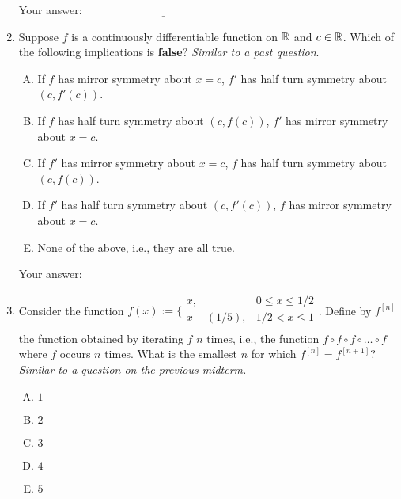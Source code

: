 \documentclass[10pt]{amsart}
\begin{document}
\begin{enumerate}
  
  \vspace{0.05in}
  Your answer: $\underline{\qquad\qquad\qquad\qquad\qquad\qquad\qquad}$
  \vspace{0.05in}
  
\item Suppose $f$ is a continuously differentiable function on $\mathbb{R}$
  and $c \in \mathbb{R}$. Which of the following implications is {\bf false}?
  {\em Similar to a past question}.

  \begin{enumerate}[(A)]
  \item If $f$ has mirror symmetry about $x = c$, $f'$ has half turn
    symmetry about $(c,f'(c))$.
  \item If $f$ has half turn symmetry about $(c,f(c))$, $f'$ has
    mirror symmetry about $x = c$.
  \item If $f'$ has mirror symmetry about $x = c$, $f$ has half turn
    symmetry about $(c,f(c))$.
  \item If $f'$ has half turn symmetry about $(c,f'(c))$, $f$ has
    mirror symmetry about $x = c$.
  \item None of the above, i.e., they are all true.
  \end{enumerate}

  
\vspace{0.05in}
  Your answer: $\underline{\qquad\qquad\qquad\qquad\qquad\qquad\qquad}$
\vspace{0.05in}
  

\item Consider the function $f(x) := \lbrace\begin{array}{rl} x, & 0
  \le x \le 1/2 \\ x - (1/5), & 1/2 < x \le 1 \\\end{array}$. Define by
  $f^{[n]}$ the function obtained by iterating $f$ $n$ times, i.e.,
  the function $f \circ f \circ f \circ \dots \circ f$ where $f$
  occurs $n$ times. What is the smallest $n$ for which $f^{[n]} =
  f^{[n + 1]}$? {\em Similar to a question on the previous midterm.}

  \begin{enumerate}[(A)]
  \item $1$
  \item $2$
  \item $3$
  \item $4$
  \item $5$
  \end{enumerate}


\end{enumerate}
\end{document}
